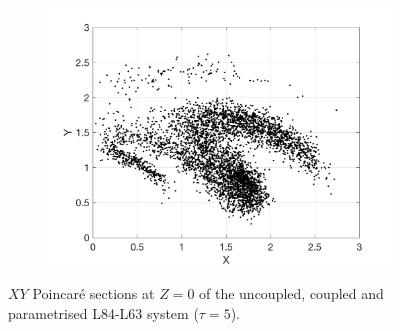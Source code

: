 \documentclass[12pt]{article}
\begin{document}
\begin{figure}[H]
\begin{subfigure}[b]{0.3\textwidth}
		\includegraphics[width=\textwidth]{plots/l84l63/poincare_xy_p5.png}
	\end{subfigure}
	\caption{\label{poincarexy5}$XY$ Poincar\'e sections at $Z=0$ of the uncoupled, coupled and parametrised L84-L63 system ($\tau=5$).}
\end{figure}
\end{document}

